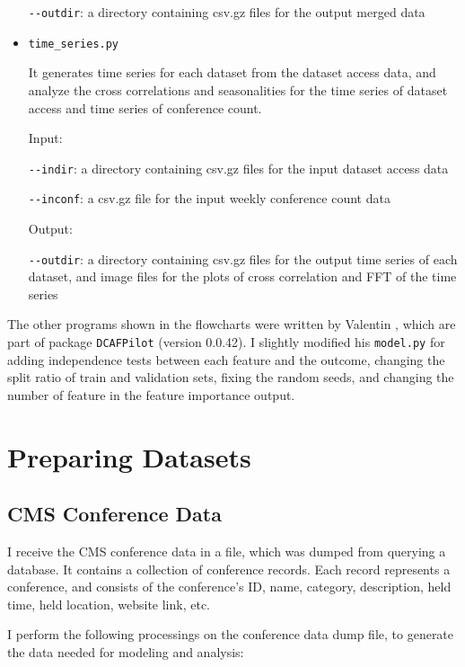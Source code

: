 \documentclass[preprint, 12pt]{elsarticle}
\begin{document}
\begin{itemize}
  \verb|--outdir|: a directory containing csv.gz files for the output merged data 

\item \verb|time_series.py|

  It generates time series for each dataset from the dataset access data, and analyze the cross correlations and seasonalities for the time series of dataset access and time series of conference count.

  Input:
  
  \verb|--indir|: a directory containing csv.gz files for the input dataset access data

  \verb|--inconf|: a csv.gz file for the input weekly conference count data

  Output:

  \verb|--outdir|: a directory containing csv.gz files for the output time series of each dataset, and image files for the plots of cross correlation and FFT of the time series

\end{itemize}


The other programs shown in the flowcharts were written by Valentin \cite{web:vkgithub}, which are part of package \verb|DCAFPilot| (version 0.0.42). I slightly modified his \verb|model.py| for  adding independence tests between each feature and the outcome, changing the split ratio of train and validation sets, fixing the random seeds, and changing the number of feature in the feature importance output.

\section{Preparing Datasets}
\label{S:2}

\subsection{CMS Conference Data}


I receive the CMS conference data in a file, which was dumped from querying a database.
It contains a collection of conference records.
Each record represents a conference, and consists of the conference's ID, name, category, description, held time, held location, website link, etc.

I perform the following processings on the conference data dump file, to generate the data needed for modeling and analysis:
\end{document}
